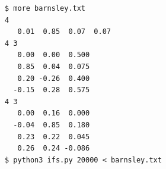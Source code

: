\documentclass[8pt,a4paper,compress]{beamer}
\begin{document}
\begin{frame}[fragile]
\begin{minipage}{160pt}
\begin{lstlisting}[language={}]
$ more barnsley.txt
4
   0.01  0.85  0.07  0.07
4 3
   0.00  0.00  0.500
   0.85  0.04  0.075
   0.20 -0.26  0.400
  -0.15  0.28  0.575
4 3
   0.00  0.16  0.000
  -0.04  0.85  0.180
   0.23  0.22  0.045
   0.26  0.24 -0.086
$ python3 ifs.py 20000 < barnsley.txt
\end{lstlisting}
\end{minipage}%
\begin{minipage}{140pt}
\begin{center}
\hfill {}
\end{center}
\end{minipage}
\end{frame}
\end{document}
